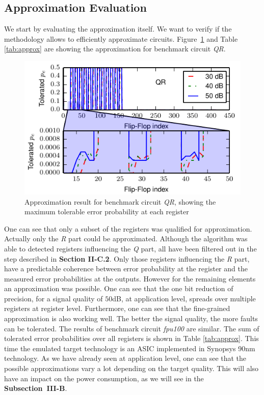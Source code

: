 \documentclass[10pt,twocolumn]{IEEEtran} %
\begin{document}
\subsection{\bf{Approximation Evaluation}}
We start by evaluating the approximation itself. We want to verify if the methodology allows to efficiently approximate circuits.
Figure~\ref{fig:optimization_qr} and Table \ref{tab:approx} are showing the approximation for benchmark circuit \emph{QR}. 
\begin{figure}[htb]
  \centering
  \includegraphics[width=.48\textwidth]{figs/optimization_qr}
  \caption{Approximation result for benchmark circuit \emph{QR}, showing the maximum tolerable error probability at each register}
  \label{fig:optimization_qr}
\end{figure}
One can see that only a subset of the registers was qualified for approximation. Actually only the \emph{R} part could be approximated. Although the algorithm was able to detected registers influencing the \emph{Q} part, all have been filtered out in the step described in {\bf Section II-C.2}. Only those registers influencing the \emph{R} part, have a predictable coherence between error probability at the register and the measured error probabilities at the outputs. However for the remaining elements an approximation was possible. One can see that the one bit reduction of precision, for a signal quality of $50$dB, at application level, spreads over multiple registers at register level. Furthermore, one can see that the fine-grained approximation is also working well. The better the signal quality, the more faults can be tolerated.
The results of benchmark circuit \emph{fpu100} are similar. The sum of tolerated error probabilities over all registers is shown in Table \ref{tab:approx}. This time the emulated target technology is an ASIC implemented in Synopsys 90nm technology. As we have already seen at application level, one can see that the possible approximations vary a lot depending on the target quality. This will also have an impact on the power consumption, as we will see in the {\bf Subsection~III-B}.
\end{document}
